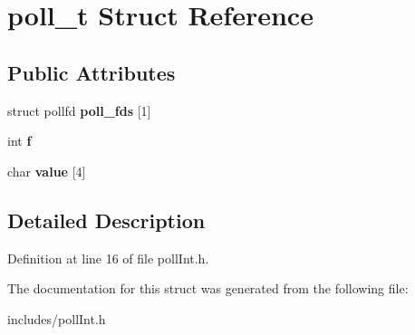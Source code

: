 \hypertarget{structpoll__t}{}\section{poll\+\_\+t Struct Reference}
\label{structpoll__t}
\subsection*{Public Attributes}
\begin{DoxyCompactItemize}
\item 
\mbox{\label{structpoll__t_aa82590940bee75bbe2401393f338c603}} 
struct pollfd {\bfseries poll\+\_\+fds} \mbox{[}1\mbox{]}
\item 
\mbox{\label{structpoll__t_ae573a0c8f65fac95581519b6b3022f72}} 
int {\bfseries f}
\item 
\mbox{\label{structpoll__t_aad71abe9f801f1ef7b156f91111eee8e}} 
char {\bfseries value} \mbox{[}4\mbox{]}
\end{DoxyCompactItemize}


\subsection{Detailed Description}


Definition at line 16 of file poll\+Int.\+h.



The documentation for this struct was generated from the following file\+:\begin{DoxyCompactItemize}
\item 
includes/poll\+Int.\+h\end{DoxyCompactItemize}

